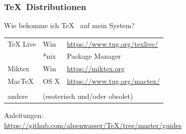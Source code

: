\documentclass{beamer}                %
\begin{document}
\begin{frame} %
    \frametitle{\TeX~Distributionen}

    Wie bekomme ich \TeX~ auf mein System?\\[2mm]

    \begin{center}
        \begin{tabular}{lll}
            TeX Live                                                          & 
            Win                                                               & 
            \href{https://www.tug.org/texlive/}{https://www.tug.org/texlive/} \\

                                                                              &
            *nix                                                              &
            Package Manager                                                   \\

            Miktex                                                            &
            Win                                                               & 
            \href{https://miktex.org}{https://miktex.org}                     \\

            MacTeX                                                            & 
            OS X                                                              & 
            \href{https://www.tug.org/mactex/}{https://www.tug.org/mactex/}   \\

            \\

            \textcolor{solarized-base0}{andere}                               & 
            \multicolumn{2}{l}{%
                \textcolor{solarized-base0}{(esoterisch und/oder obsolet)}}   \\
        \end{tabular}

    \vspace{1em}
        \alert{Anleitungen: \\
            \href{https://github.com/alpenwasser/TeX/tree/master/guides}
                 {https://github.com/alpenwasser/TeX/tree/master/guides}}
    \end{center}
\end{frame}
\end{document}
